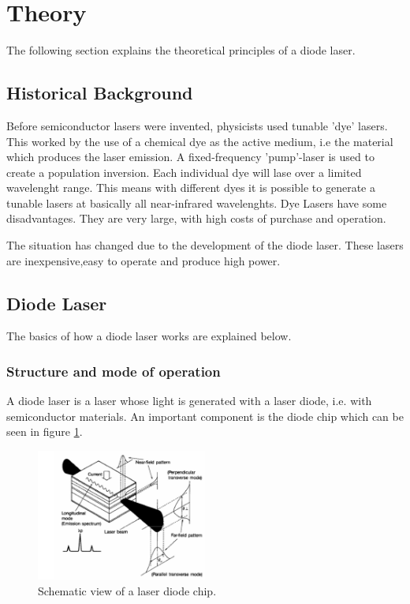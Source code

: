 \section{Theory}
\label{sec:theory}

The following section explains the theoretical principles of a diode laser.

\subsection{Historical Background}
\label{sec:Historical Background}

Before semiconductor lasers were invented, physicists used tunable 'dye' lasers.
This worked by the use of a chemical dye as the active medium, i.e the material which produces the laser emission.
A fixed-frequency 'pump'-laser is used to create a population inversion. Each individual dye will lase over a limited wavelenght range.
This means with different dyes it is possible to generate a tunable lasers at basically all near-infrared wavelenghts.
Dye Lasers have some disadvantages. They are very large, with high costs of purchase and operation.

The situation has changed due to the development of the diode laser. These lasers are inexpensive,easy to operate and produce high power.

\subsection{Diode Laser}
\label{sec:Diode Laser}

The basics of how a diode laser works are explained below.

\subsubsection{Structure and mode of operation}
\label{Structure and mode of operation}

A diode laser is a laser whose light is generated with a laser diode, i.e. with semiconductor materials.
An important component is the diode chip which can be seen in figure \ref{fig:diodechip}.

\begin{figure}[H]
    \centering
    \includegraphics[width=0.5\textwidth]{content/graphics/laserdiodechip.jpg}
    \caption{Schematic view of a laser diode chip.} %
    \label{fig:diodechip}
\end{figure}

